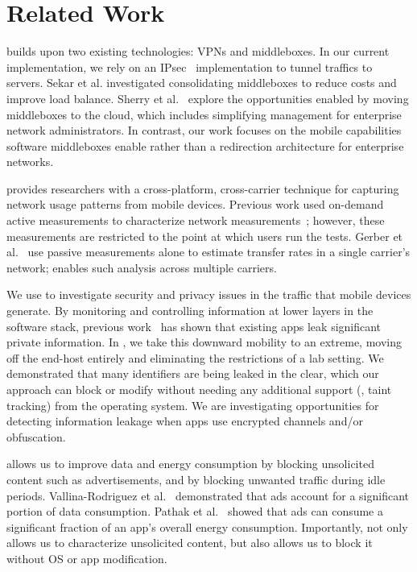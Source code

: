 \section{Related Work}
\meddle builds upon two existing technologies: VPNs and middleboxes. 
In our current implementation, we rely on an IPsec~\cite{rfc:ipsec} implementation 
to tunnel traffics to \meddle servers. Sekar et al. investigated consolidating middleboxes 
to reduce costs and improve load balance. Sherry et al.~\cite{sherry:middleboxes} explore the opportunities 
enabled by moving middleboxes to the cloud, which includes simplifying management 
for enterprise network administrators. In contrast, our work focuses on the mobile capabilities 
software middleboxes enable rather than a redirection architecture for enterprise networks. 

\meddle provides researchers with a cross-platform, cross-carrier technique 
for capturing network usage patterns from mobile devices. Previous work 
used on-demand active measurements to characterize network measurements~\cite{wang:middleboxes,speedtest}; 
however, these measurements are restricted to the point at which users run 
the tests. Gerber et al.~\cite{gerber:passivespeed} use passive measurements alone 
to estimate transfer rates in a single carrier's network; \meddle 
enables such analysis across multiple carriers.

We use \meddle to investigate security and privacy issues in the 
traffic that mobile devices generate. By monitoring and controlling 
information at lower layers in the software stack, previous work~\cite{enck:taintdroid,hornyack:appfence,wsj:apps-watching-you} has shown 
that existing apps leak significant private information. In \meddle, we take 
this downward mobility to an extreme, moving off the end-host entirely and 
eliminating the restrictions of a lab setting. We demonstrated that  
many identifiers are being leaked in the clear, which our approach can 
block or modify without needing any additional support (\eg, taint tracking) 
from the operating system. We are investigating 
opportunities for detecting information leakage when apps use encrypted 
channels and/or obfuscation.

\meddle allows us to improve data and energy consumption by blocking 
unsolicited content such as advertisements, and by blocking unwanted 
traffic during idle periods. Vallina-Rodriguez et al.~\cite{vallina-rod:ads} demonstrated 
that ads account for a significant portion of data consumption. Pathak et al.~\cite{pathak:eprof} 
showed that ads can consume a significant fraction of an app's overall energy consumption. 
Importantly, \meddle not only allows us to characterize unsolicited content, but 
also allows us to block it without OS or app modification.

